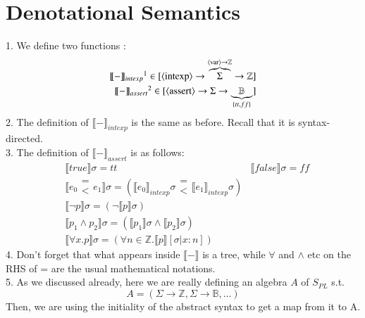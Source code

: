 \documentclass{article}[12pt]
\begin{document}
\section{Denotational Semantics}
1. We define two functions :
\begin{align*}
    \llbracket - \rrbracket_{intexp}\footnotemark \in [\nonterminal{intexp} \rightarrow \overbrace{\Sigma}^{\nonterminal{var}\rightarrow \mathbb{Z}} \rightarrow \mathbb{Z}] \\
    \llbracket - \rrbracket_{assert}\footnotemark \in [\nonterminal{assert} \rightarrow \Sigma \rightarrow \underbrace{\mathbb{B}}_{\{tt, ff\}}]
\end{align*}
2. The definition of $\llbracket - \rrbracket_{intexp}$ is the same as before. Recall that it is syntax-directed. \\
3. The definition of $\llbracket - \rrbracket_{assert}$ is as follows:
\begin{align*}
    &\llbracket true \rrbracket \sigma = tt &\llbracket false \rrbracket \sigma = ff \\
    &\llbracket e_0 \begin{array}{c} = \\ < \end{array} e_1 \rrbracket \sigma = (\llbracket e_0 \rrbracket_{intexp} \sigma \begin{array}{c} = \\ < \end{array} \llbracket e_1 \rrbracket_{intexp} \sigma) \\
    &\llbracket \neg p \rrbracket \sigma = (\neg \llbracket p \rrbracket \sigma) \\
    &\llbracket p_1 \wedge p_2 \rrbracket \sigma = (\llbracket p_1 \rrbracket \sigma \wedge \llbracket p_2 \rrbracket \sigma) \\
    &\llbracket \forall x. p \rrbracket \sigma = (\forall n \in \mathbb{Z}. \llbracket p \rrbracket [\sigma|x:n])
\end{align*}
4. Don't forget that what appears inside $\llbracket - \rrbracket$ is a tree, while $\forall$ and $\wedge$ etc on the RHS of = are the usual mathematical notations. \\
5. As we discussed already, here we are really defining an algebra $A$ of $S_{PL}$ s.t. \[A=(\Sigma \rightarrow \mathbb{Z}, \Sigma \rightarrow \mathbb{B}, \ldots)\]
Then, we are using the initiality of the abstract syntax to get a map from it to A.
\end{document}
